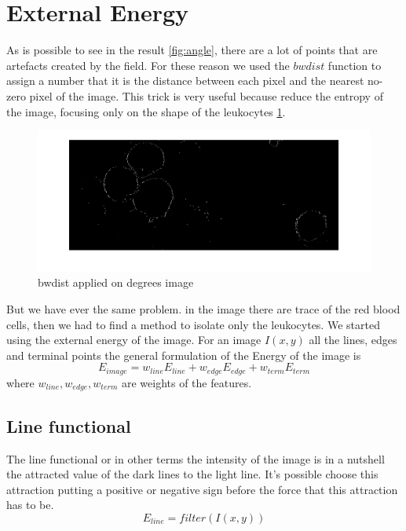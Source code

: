 \section{External Energy}
As is possible to see in the result \ref{fig:angle}, there are a lot of points that are artefacts created by the field. For these reason we used the $bwdist$ function to assign a number that it is the distance between each pixel and the nearest no-zero pixel of the image. This trick is very useful because reduce the entropy of the image, focusing only on the shape of the leukocytes \ref{fig:bwdistangle}.
\begin{figure}
	\begin{center}
		\centering
		\includegraphics[scale=0.5]{img/bwdistAngle.png}
		\caption{bwdist applied on degrees image}
		\label{fig:bwdistangle}
	\end{center}
\end{figure}
But we have ever the same problem. in the image there are trace of the red blood cells, then we had to find a method to isolate only the leukocytes. We started using the external energy of the image. For an image $I(x,y)$ all the lines, edges and terminal points the general formulation of the Energy of the image is
\begin{equation}
 E_{image}=w_{line}E_{line} + w_{edge}E_{edge} + w_{term}E_{term}
\end{equation}
where $w_{line}, w_{edge}, w_{term}$ are weights of the features.

\subsection{Line functional}
The line functional or in other terms the intensity of the image is in a nutshell the attracted value of the dark lines to the light line. It's possible choose this attraction putting a positive or negative sign before the force that this attraction has to be.
\begin{equation}
	E_{{line}}=filter(I(x,y))
\end{equation}


